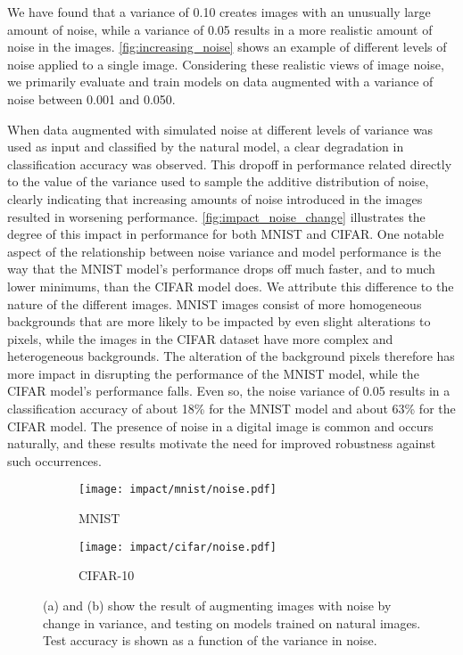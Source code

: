 \documentclass[conference]{IEEEtran}
\begin{document}
We have found that a variance of 0.10 creates images with an unusually large amount of noise, while a variance of 0.05 results in a more realistic amount of noise in the images. \autoref{fig:increasing_noise} shows an example of different levels of noise applied to a single image. Considering these realistic views of image noise, we primarily evaluate and train models on data augmented with a variance of noise between 0.001 and 0.050.

When data augmented with simulated noise at different levels of variance was used as input and classified by the natural model, a clear degradation in classification accuracy was observed. This dropoff in performance related directly to the value of the variance used to sample the additive distribution of noise, clearly indicating that increasing amounts of noise introduced in the images resulted in worsening performance. \autoref{fig:impact_noise_change} illustrates the degree of this impact in performance for both MNIST and CIFAR. One notable aspect of the relationship between noise variance and model performance is the way that the MNIST model’s performance drops off much faster, and to much lower minimums, than the CIFAR model does. We attribute this difference to the nature of the different images. MNIST images consist of more homogeneous backgrounds that are more likely to be impacted by even slight alterations to pixels, while the images in the CIFAR dataset have more complex and heterogeneous backgrounds. The alteration of the background pixels therefore has more impact in disrupting the performance of the MNIST model, while the CIFAR model’s performance falls. Even so, the noise variance of 0.05 results in a classification accuracy of about 18\% for the MNIST model and about 63\% for the CIFAR model. The presence of noise in a digital image is common and occurs naturally, and these results motivate the need for improved robustness against such occurrences.

\begin{figure}[H]
    \centering
    \begin{subfigure}{0.49\columnwidth}
        \centering
        \texttt{[image: impact/mnist/noise.pdf]}
        \caption{MNIST}
    \end{subfigure}
    \begin{subfigure}{0.49\columnwidth}
        \centering
        \texttt{[image: impact/cifar/noise.pdf]}
        \caption{CIFAR-10}
    \end{subfigure}
    \captionsetup{width=1\columnwidth}
    \caption{(a) and (b) show the result of augmenting images with noise by change in variance, and testing on models trained on natural images. Test accuracy is shown as a function of the variance in noise.}
    \label{fig:impact_noise_change}
\end{figure}
\end{document}
